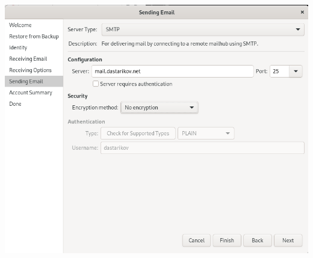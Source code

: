 \begin{enumerate}
\begin{center}
    \label{12}
\end{center}
\begin{center}
    \centering
    \includegraphics[width=\textwidth]{../images/image13.png}
    \label{13}
\end{center}


\end{enumerate}
